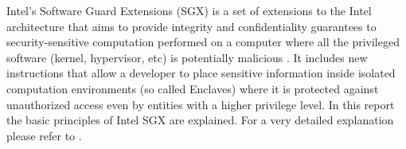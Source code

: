 Intel’s Software Guard Extensions (SGX) is a set of extensions to the Intel architecture that aims to provide integrity and confidentiality guarantees to security-sensitive
computation performed on a computer where all the privileged software (kernel, hypervisor, etc) is potentially malicious \cite{Costan2016IntelSE}. It includes new instructions
that allow a developer to place sensitive information inside isolated computation environments (so called Enclaves) where it is protected against unauthorized access even by
entities with a higher privilege level. In this report the basic principles of Intel SGX are explained. For a very detailed explanation please refer to \cite{Costan2016IntelSE}.
